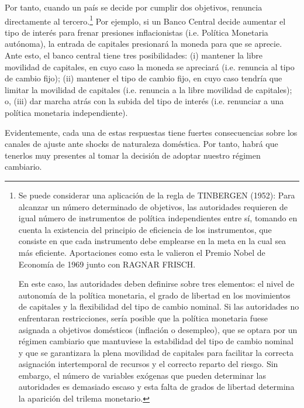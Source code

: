 \documentclass[10pt,a4paper]{article}
\begin{document}
Por tanto, cuando un país se decide por cumplir dos objetivos, renuncia directamente al tercero.\footnote{%
    Se puede considerar una aplicación de la regla de TINBERGEN (1952): Para alcanzar un número determinado de objetivos, las autoridades requieren de igual número de instrumentos de política independientes entre sí, tomando en cuenta la existencia del principio de eficiencia de los instrumentos, que consiste en que cada instrumento debe emplearse en la meta en la cual sea más eficiente. Aportaciones como esta le valieron el Premio Nobel de Economía de 1969 junto con RAGNAR FRISCH.
  
    En este caso, las autoridades deben definirse sobre tres elementos: el nivel de autonomía de la política monetaria, el grado de libertad en los movimientos de capitales y la flexibilidad del tipo de cambio nominal. Si las autoridades no enfrentaran restricciones, sería posible que la política monetaria fuese asignada a objetivos domésticos (inflación o desempleo), que se optara por un régimen cambiario que mantuviese la estabilidad del tipo de cambio nominal y que se garantizara la plena movilidad de capitales para facilitar la correcta asignación intertemporal de recursos y el correcto reparto del riesgo. Sin embargo, el número de variables exógenas que pueden determinar las autoridades es demasiado escaso y esta falta de grados de libertad determina la aparición del trilema monetario.
} Por ejemplo, si un Banco Central decide aumentar el tipo de interés para frenar presiones inflacionistas (i.e. Política Monetaria autónoma), la entrada de capitales presionará la moneda para que se aprecie. Ante esto, el banco central tiene tres posibilidades: (i) mantener la libre movilidad de capitales, en cuyo caso la moneda se apreciará (i.e. renuncia al tipo de cambio fijo); (ii) mantener el tipo de cambio fijo, en cuyo caso tendría que limitar la movilidad de capitales (i.e. renuncia a la libre movilidad de capitales); o, (iii) dar marcha atrás con la subida del tipo de interés (i.e. renunciar a una política monetaria independiente). 

Evidentemente, cada una de estas respuestas tiene fuertes consecuencias sobre los canales de ajuste ante shocks de naturaleza doméstica. Por tanto, habrá que tenerlos muy presentes al tomar la decisión de adoptar nuestro régimen cambiario. 
\end{document}
